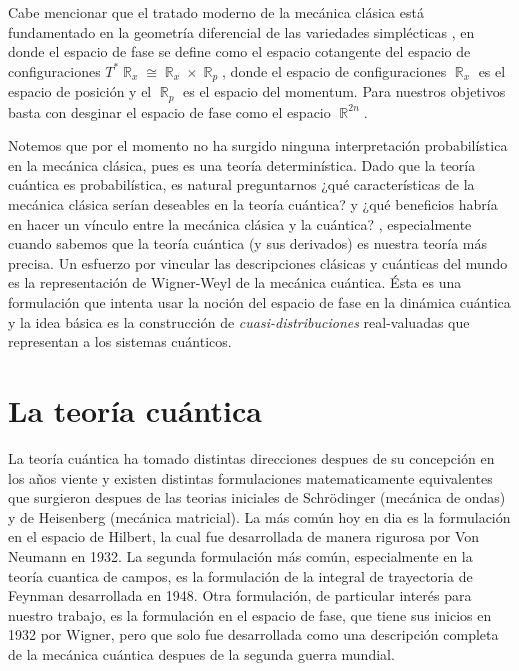 \documentclass[a4paper]{report}
\DeclareMathOperator{\R}{\mathbb{R}}
\begin{document}
  Cabe mencionar que el tratado moderno de la mecánica
  clásica está fundamentado en la geometría diferencial de
  las variedades simplécticas
  \cite{mcinerneyFirstStepsDifferential2013}, en donde el
  espacio de fase se define como el espacio cotangente del
  espacio de configuraciones $T^{*} \R_x \cong \R_x \times
  \R_p$, donde el espacio de configuraciones  $\R_x$ es el
  espacio de posición y el $\R_p$ es el espacio del
  momentum.  Para nuestros objetivos basta con desginar el
  espacio de fase como el espacio $\R^{2n}$.

  Notemos que por el momento no ha surgido ninguna
  interpretación probabilística en la mecánica clásica, pues
  es una teoría determinística. Dado que la teoría cuántica
  es probabilística, es natural preguntarnos ¿qué
  características de la mecánica clásica serían deseables en
  la teoría cuántica? y ¿qué beneficios habría en hacer un
  vínculo entre la mecánica clásica y la cuántica?
  \cite{schroeckQuantumMechanicsPhase1996}, especialmente
  cuando sabemos que la teoría cuántica (y sus derivados) es
  nuestra teoría más precisa. Un esfuerzo por vincular las
  descripciones clásicas y cuánticas del mundo es la
  representación de Wigner-Weyl de la mecánica cuántica.
  Ésta es una formulación que intenta usar la noción del
  espacio de fase en la dinámica cuántica y la idea básica
  es la construcción de \textit{cuasi-distribuciones}
  real-valuadas que representan a los sistemas cuánticos.

  \section{La teoría cuántica}

  La teoría cuántica ha tomado distintas direcciones despues
  de su concepción en los años viente y existen distintas
  formulaciones matematicamente equivalentes que surgieron
  despues de las teorias iniciales de Schrödinger (mecánica
  de ondas) y de Heisenberg (mecánica matricial).  La más
  común hoy en dia es la formulación en el espacio de
  Hilbert, la cual fue desarrollada de manera rigurosa por
  Von Neumann en 1932.  La segunda formulación más común,
  especialmente en la teoría cuantica de campos, es la
  formulación de la integral de trayectoria de Feynman
  desarrollada en 1948.  Otra formulación, de particular
  interés para nuestro trabajo, es la formulación en el
  espacio de fase, que tiene sus inicios en 1932 por Wigner,
  pero que solo fue desarrollada como una descripción
  completa de la mecánica cuántica despues de la segunda
  guerra mundial. 
\end{document}
